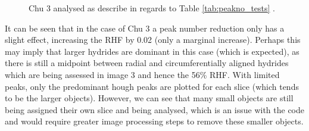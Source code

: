 \documentclass{article}
\begin{document}
    \begin{figure}[H]
        \centering
        \hfill
        \caption{Chu 3 analysed as describe in regards to Table \ref{tab:peakno_tests} .}
    \label{fig:chu3_PN_comparison}
    \end{figure}
    
    It can be seen that in the case of Chu 3 a peak number reduction only has a slight effect, increasing the RHF by 0.02 (only a marginal increase). Perhaps this may imply that larger hydrides are dominant in this case (which is expected), as there is still a midpoint between radial and circumferentially aligned hydrides which are being assessed in image 3 and hence the 56\% RHF. With limited peaks, only the predominant hough peaks are plotted for each slice (which tends to be the larger objects). However, we can see that many small objects are still being assigned their own slice and being analysed, which is an issue with the code and would require greater image processing steps to remove these smaller objects.
    
\end{document}

